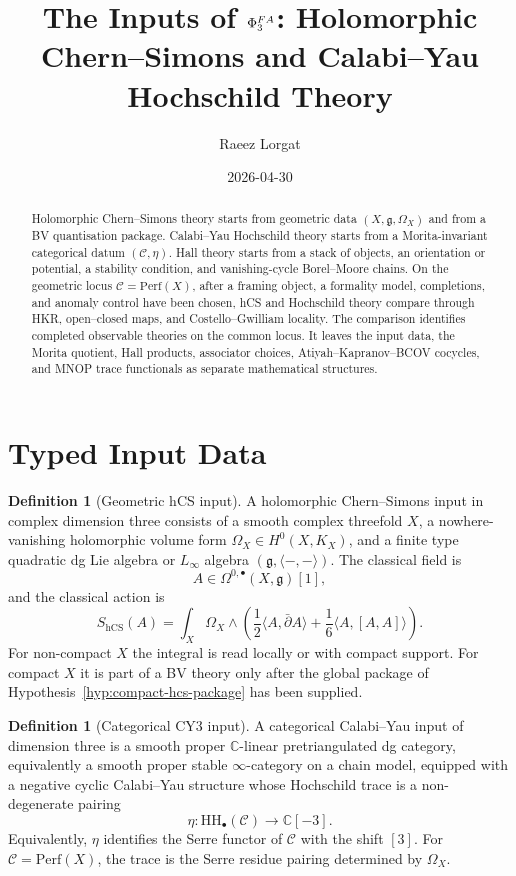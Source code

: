 \documentclass[11pt]{amsart}
\title{The Inputs of $\Phi^{FA}_3$: Holomorphic Chern--Simons and
Calabi--Yau Hochschild Theory}
\author{Raeez Lorgat}
\date{2026-04-30}
\theoremstyle{definition}
\newtheorem{definition}[theorem]{Definition}
\theoremstyle{remark}
\providecommand{\cC}{\mathcal{C}}
\providecommand{\Cx}{\mathbb{C}}
\providecommand{\HH}{\mathrm{HH}}
\providecommand{\Perf}{\mathrm{Perf}}
\providecommand{\dbar}{\bar\partial}
\providecommand{\hCS}{\mathrm{hCS}}
\providecommand{\fg}{\mathfrak{g}}
\begin{document}
\maketitle

\begin{abstract}
Holomorphic Chern--Simons theory starts from geometric data
$(X,\fg,\Omega_X)$ and from a BV quantisation package.  Calabi--Yau
Hochschild theory starts from a Morita-invariant categorical datum
$(\cC,\eta)$.  Hall theory starts from a stack of objects, an orientation
or potential, a stability condition, and vanishing-cycle Borel--Moore
chains.  On the geometric locus $\cC=\Perf(X)$, after a framing object, a
formality model, completions, and anomaly control have been chosen, hCS
and Hochschild theory compare through HKR, open--closed maps, and
Costello--Gwilliam locality.  The comparison identifies completed
observable theories on the common locus.  It leaves the input data, the
Morita quotient, Hall products, associator choices, Atiyah--Kapranov--BCOV
cocycles, and MNOP trace functionals as separate mathematical structures.
\end{abstract}

\section{Typed Input Data}

\begin{definition}[Geometric hCS input]
\label{def:hcs-input}
A holomorphic Chern--Simons input in complex dimension three consists of
a smooth complex threefold $X$, a nowhere-vanishing holomorphic volume
form $\Omega_X\in H^0(X,K_X)$, and a finite type quadratic dg Lie algebra
or $L_\infty$ algebra $(\fg,\langle-,-\rangle)$.  The classical field is
\[
  A\in \Omega^{0,\bullet}(X,\fg)[1],
\]
and the classical action is
\begin{equation}
\label{eq:hcs-action}
  S_{\hCS}(A)
  =
  \int_X \Omega_X\wedge
  \left(
    \frac12\langle A,\dbar A\rangle
    +\frac16\langle A,[A,A]\rangle
  \right).
\end{equation}
For non-compact $X$ the integral is read locally or with compact support.
For compact $X$ it is part of a BV theory only after the global package of
Hypothesis~\ref{hyp:compact-hcs-package} has been supplied.
\end{definition}

\begin{definition}[Categorical CY3 input]
\label{def:cat-input}
A categorical Calabi--Yau input of dimension three is a smooth proper
$\Cx$-linear pretriangulated dg category, equivalently a smooth proper
stable $\infty$-category on a chain model, equipped with a negative cyclic
Calabi--Yau structure whose Hochschild trace is a non-degenerate pairing
\[
  \eta\colon \HH_\bullet(\cC)\longrightarrow \Cx[-3].
\]
Equivalently, $\eta$ identifies the Serre functor of $\cC$ with the shift
$[3]$.  For $\cC=\Perf(X)$, the trace is the Serre residue pairing
determined by $\Omega_X$.
\end{definition}
\end{document}
